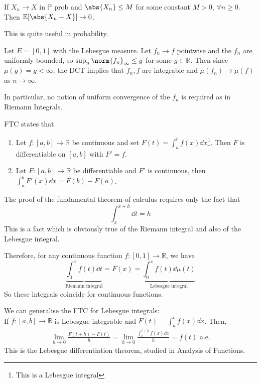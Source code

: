 \begin{theorem}
	If $X_n \to X$ in $\mathbb{P}$ prob and $\abs{X_n} \leq M$ for some constant $M > 0$, $\forall n \geq 0$.
	Then $\mathbb{E}[\abs{X_n - X}] \to 0$.
\end{theorem}

This is quite useful in probability.

\begin{example}
	Let $E = [0,1]$ with the Lebesgue measure.
	Let $f_n \to f$ pointwise and the $f_n$ are uniformly bounded, so $\sup_n \norm{f_n}_\infty \leq g$ for some $g \in \mathbb R$.
	Then since $\mu(g) = g < \infty$, the DCT implies that $f_n, f$ are integrable and $\mu(f_n) \to \mu(f)$ as $n \to \infty$.

	In particular, no notion of uniform convergence of the $f_n$ is required as in Riemann Integrals.
\end{example}

\begin{remark}
	FTC states that
	\begin{enumerate}
		\item Let $f : [a, b] \to \mathbb{R}$ be continuous and set $F(t) = \int_{a}^{t} f(x) \dd{x}$\footnote{This is a Lebesgue integral}.
		Then $F$ is differentiable on $[a, b]$ with $F' = f$.
		\item Let $F : [a, b] \to \mathbb{R}$ be differentiable and $F'$ is continuous, then $\int_{a}^{b} F'(x) \dd{x} = F(b) - F(a)$.
	\end{enumerate}
	The proof of the fundamental theorem of calculus requires only the fact that
	\[ \int_x^{x + h} \dd{t} = h \]
	This is a fact which is obviously true of the Riemann integral and also of the Lebesgue integral.

	Therefore, for any continuous function $f \colon [0,1] \to \mathbb R$, we have
	\[ \underbrace{\int_0^x f(t) \dd{t}}_{\text{Riemann integral}} = F(x) = \underbrace{\int_0^x f(t) \dd{\mu(t)}}_{\text{Lebesgue integral}} \]
	So these integrals coincide for continuous functions.
\end{remark}

\begin{remark}
	We can generalise the FTC for Lebesgue integrals: \\
	If $f : [a, b] \to \mathbb{R}$ is Lebesgue integrable and $F(t) = \int_{a}^{t} f(x) \dd{x}$.
	Then,
	\begin{align*}
		\lim_{h \to 0} \frac{F(t+h) - F(t)}{h} = \lim_{h \to 0} \frac{\int_{t}^{t + h} f(x) \dd{x}}{h} = f(t) \text{ a.e.}
	\end{align*}
	This is the Lebesgue differentiation theorem, studied in Analysis of Functions.
\end{remark}

